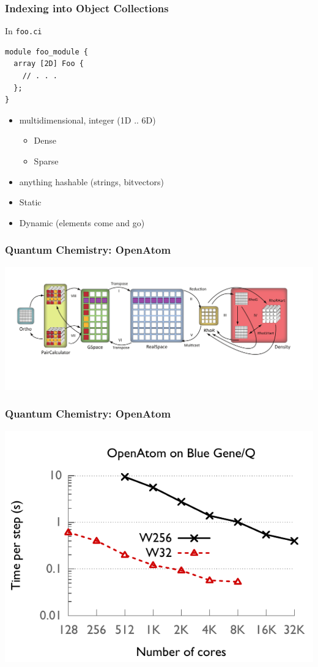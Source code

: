 \begin{frame}[fragile]
\frametitle{Indexing into Object Collections}
\begin{block}{In \texttt{foo.ci}}
\begin{lstlisting}
module foo_module {
  array [2D] Foo {
    // . . .
  };
}
\end{lstlisting}
\end{block}
    \begin{itemize}
       \item multidimensional, integer (1D .. 6D)
        \begin{itemize}
            \item Dense
            \item Sparse
        \end{itemize}
       \item anything hashable (strings, bitvectors)
       \item Static
       \item Dynamic (elements come and go)
    \end{itemize}
\end{frame}


\begin{frame}
\frametitle{Quantum Chemistry: OpenAtom}
\includegraphics[width=\textwidth]{../figures/openatom/control-flow.pdf}
\end{frame}


\begin{frame}
\frametitle{Quantum Chemistry: OpenAtom}
\includegraphics[width=\textwidth]{../figures/openatom/bgq.pdf}
\end{frame}



